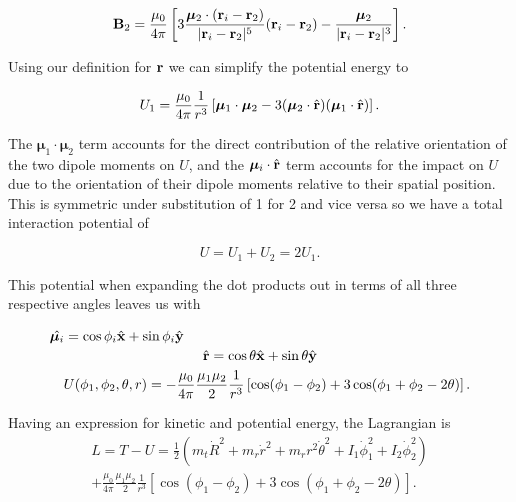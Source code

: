 \documentclass[prbg,preprint]{revtex4-1}
\newcommand{\cvec}[1]{{\rm{\bf{#1}}}}
\begin{document}
\begin{equation}
\cvec B_2 = 
\frac{\mu_0}{4\pi}\left[
	3\frac{\boldsymbol \mu_2 \cdot (\cvec r_i - \cvec r_2)}{|\cvec r_i - \cvec r_2|^5}(
	\cvec r_i - \cvec r_2
	)
	-\frac{\boldsymbol \mu_2}{|\cvec r_i - \cvec r_2|^3}
\right].
\end{equation}

Using our definition for $\cvec r$ we can simplify the potential energy to

\begin{equation}
U_1 = 
\frac{\mu_0}{4\pi}
\frac{1}{r^3}\left[
	\boldsymbol \mu_1 \cdot \boldsymbol \mu_2
	-3(
		\boldsymbol \mu_2 \cdot \hat {\cvec r}
		)(
		\boldsymbol \mu_1 \cdot \hat {\cvec r}		
		)
\right].
\end{equation}

The $\boldsymbol \mu_1 \cdot \boldsymbol \mu_2$ term accounts 
for the direct contribution of the relative orientation of the two dipole moments on $U$, 
and the $\boldsymbol \mu_i \cdot \hat {\cvec r}$ term accounts for the impact on $U$ due to the orientation of their dipole moments relative to their spatial position.
This is symmetric under substitution of 1 for 2 and vice versa so we have a total interaction potential of

\begin{equation}
U =
U_1+U_2
= 
2U_1.
\end{equation}

This potential when expanding the dot products out in terms of all three respective angles leaves us with

\begin{equation}
  \begin{multlined}
\hat {\boldsymbol \mu_i} =  \cos \phi_i \hat {\cvec x} + \sin \phi_i \hat {\cvec y}
\\
\hat {\cvec r} =  \cos \theta \hat {\cvec x} + \sin \theta \hat {\cvec y}
\\
U(\phi_1, \phi_2, \theta, r) =
-\frac{\mu_0}{4\pi}
\frac{\mu_1 \mu_2}{2}
\frac{1}{r^3}\left[
	\cos(\phi_1-\phi_2)
	+3\cos(\phi_1+\phi_2 -2\theta)
\right].
  \end{multlined}
\end{equation}

Having an expression for kinetic and potential energy, the Lagrangian is 
\begin{equation}
  \begin{multlined}
    L=T-U=
    \frac{1}{2}(
        m_t \dot R^2
        +m_r \dot r^2
        +m_r r^2 \dot \theta^2
        + I_1 \dot \phi_1^2
        + I_2 \dot \phi_2^2
    )
    \\
    +
    \frac{\mu_0}{4\pi}
    \frac{\mu_1 \mu_2}{2}
    \frac{1}{r^3}
    [
        \cos(\phi_1-\phi_2)
        +3\cos(\phi_1+\phi_2 -2\theta)
    ].
  \end{multlined}
\end{equation}
\end{document}
